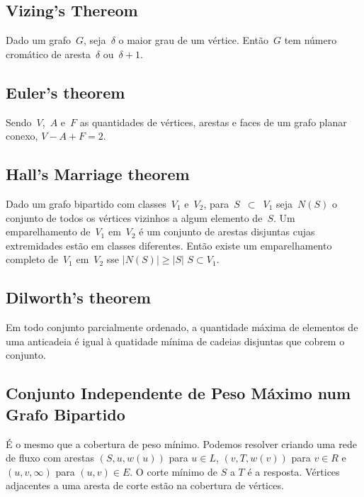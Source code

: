 \subsection{Vizing's Thereom}
Dado um grafo~$G$, seja~$\delta$ o maior grau de um vértice. Então~$G$ tem número cromático de aresta~$\delta$ ou~$\delta + 1$.

\subsection{Euler's theorem}
Sendo~$V$,~$A$ e~$F$ as quantidades de vértices, arestas e faces de um grafo planar conexo,
$V - A + F = 2$.
       
\subsection{Hall's Marriage theorem}
Dado um grafo bipartido com classes~$V_1$ e~$V_2$, para~$S$~$\subset$~$V_1$ seja~$N(S)$ o conjunto de todos os vértices vizinhos a algum elemento de~$S$. Um emparelhamento de~$V_1$ em~$V_2$ é um conjunto de arestas disjuntas cujas extremidades estão em classes diferentes. Então existe um emparelhamento completo de~$V_1$ em~$V_2$ sse $|N(S)| \geq |S|$ \forall $ S \subset V_1 $.
    
\iffalse %
\subsection{Maximum Density Subgraph}
Given (weighted) undirected graph $G$. Binary search density. If $g$ is
current density, construct flow network: $(S, u, m)$, $(u, T,
m+2g-d_u)$, $(u,v,1)$, where $m$ is a large constant (larger than sum
of edge weights). Run floating-point max-flow. If minimum cut has empty
$S$-component, then maximum density is smaller than $g$, otherwise it's
larger. Distance between valid densities is at least $1/(n(n-1))$. Edge
case when density is $0$. This also works for weighted graphs by
replacing $d_u$ by the weighted degree, and doing more iterations (if
weights are not integers).
\fi

\subsection{Dilworth's theorem}
Em todo conjunto parcialmente ordenado, a quantidade máxima de elementos de uma anticadeia é igual à  quatidade mínima de cadeias disjuntas que cobrem o conjunto.

\subsection{Conjunto Independente de Peso Máximo num Grafo Bipartido}
É o mesmo que a cobertura de peso mínimo. Podemos resolver criando uma rede de fluxo com arestas $(S,u,w(u))$ para $u\in L$,
$(v,T,w(v))$ para $v\in R$ e $(u,v,\infty)$ para $(u,v)\in E$. O corte mínimo de $S$ a $T$ é a resposta. Vértices adjacentes a uma aresta de corte estão na cobertura de vértices.

